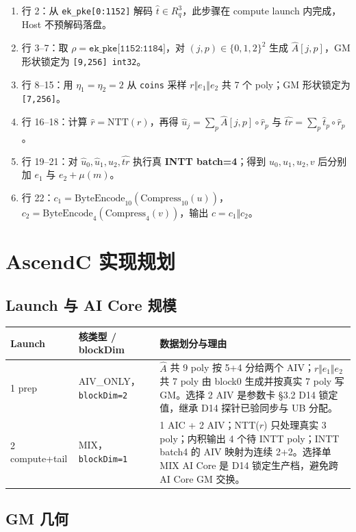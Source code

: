 \documentclass[UTF8,a4paper,11pt]{ctexart}
\begin{document}
\begin{enumerate}
  \item 行 2：从 \texttt{ek\_pke[0:1152]} 解码 \(\hat t\in R_q^3\)，此步骤在 compute launch 内完成，Host 不预解码落盘。
  \item 行 3--7：取 \(\rho=\texttt{ek\_pke[1152:1184]}\)，对 \((j,p)\in\{0,1,2\}^2\) 生成 \(\hat A[j,p]\)，GM 形状锁定为 \texttt{[9,256] int32}。
  \item 行 8--15：用 \(\eta_1=\eta_2=2\) 从 \texttt{coins} 采样 \(r\Vert e_1\Vert e_2\) 共 7 个 poly；GM 形状锁定为 \texttt{[7,256]}。
  \item 行 16--18：计算 \(\hat r=\mathrm{NTT}(r)\)，再得 \(\hat u_j=\sum_p \hat A[j,p]\circ\hat r_p\) 与 \(\widehat{tr}=\sum_p \hat t_p\circ\hat r_p\)。
  \item 行 19--21：对 \(\hat u_0,\hat u_1,\hat u_2,\widehat{tr}\) 执行真 \textbf{INTT batch=4}；得到 \(u_0,u_1,u_2,v\) 后分别加 \(e_1\) 与 \(e_2+\mu(m)\)。
  \item 行 22：\(c_1=\mathrm{ByteEncode}_{10}(\mathrm{Compress}_{10}(u))\)，\(c_2=\mathrm{ByteEncode}_{4}(\mathrm{Compress}_{4}(v))\)，输出 \(c=c_1\Vert c_2\)。
\end{enumerate}

\section{AscendC 实现规划}

\subsection{Launch 与 AI Core 规模}

\begin{longtable}{@{}L{2.5cm}L{3.0cm}L{7.6cm}@{}}
\toprule
Launch & 核类型 / blockDim & 数据划分与理由 \\
 prep & AIV\_ONLY，\texttt{blockDim=2} & \(\hat A\) 共 9 poly 按 5+4 分给两个 AIV；\(r\Vert e_1\Vert e_2\) 共 7 poly 由 block0 生成并按真实 7 poly 写 GM。选择 2 AIV 是参数卡 §3.2 D14 锁定值，继承 D14 探针已验同步与 UB 分配。 \\
2 compute+tail & MIX，\texttt{blockDim=1} & 1 AIC + 2 AIV；NTT(\(r\)) 只处理真实 3 poly；内积输出 4 个待 INTT poly；INTT batch4 的 AIV 映射为连续 2+2。选择单 MIX AI Core 是 D14 锁定生产档，避免跨 AI Core GM 交换。 \\
\bottomrule
\end{longtable}

\subsection{GM 几何}
\end{document}
